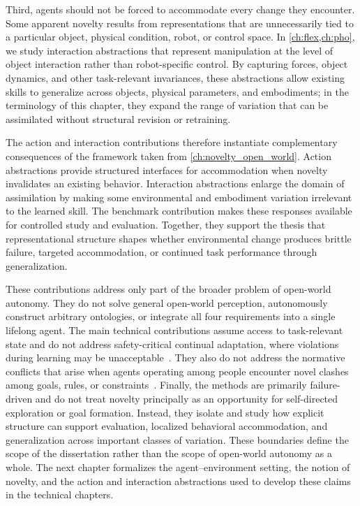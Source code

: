 Third, agents should not be forced to accommodate every change they encounter.
Some apparent novelty results from representations that are unnecessarily tied to a particular object, physical condition, robot, or control space.
In \cref{ch:flex,ch:pho}, we study interaction abstractions that represent manipulation at the level of object interaction rather than robot-specific control.
By capturing forces, object dynamics, and other task-relevant invariances, these abstractions allow existing skills to generalize across objects, physical parameters, and embodiments; in the terminology of this chapter, they expand the range of variation that can be assimilated without structural revision or retraining.

The action and interaction contributions therefore instantiate complementary consequences of the framework taken from \cref{ch:novelty_open_world}.
Action abstractions provide structured interfaces for accommodation when novelty invalidates an existing behavior.
Interaction abstractions enlarge the domain of assimilation by making some environmental and embodiment variation irrelevant to the learned skill.
The benchmark contribution makes these responses available for controlled study and evaluation.
Together, they support the thesis that representational structure shapes whether environmental change produces brittle failure, targeted accommodation, or continued task performance through generalization.

These contributions address only part of the broader problem of open-world autonomy.
They do not solve general open-world perception, autonomously construct arbitrary ontologies, or integrate all four requirements into a single lifelong agent.
The main technical contributions assume access to task-relevant state and do not address safety-critical continual adaptation, where violations during learning may be unacceptable~\citep{coursey2026safe}.
They also do not address the normative conflicts that arise when agents operating among people encounter novel clashes among goals, rules, or constraints~\citep{jones2026oamncc}.
Finally, the methods are primarily failure-driven and do not treat novelty principally as an opportunity for self-directed exploration or goal formation.
Instead, they isolate and study how explicit structure can support evaluation, localized behavioral accommodation, and generalization across important classes of variation.
These boundaries define the scope of the dissertation rather than the scope of open-world autonomy as a whole.
The next chapter formalizes the agent--environment setting, the notion of novelty, and the action and interaction abstractions used to develop these claims in the technical chapters.
